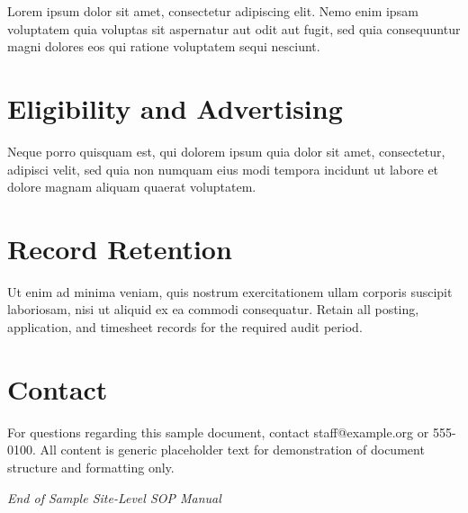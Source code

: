 \documentclass[11pt,a4paper,oneside]{article}
\begin{document}
Lorem ipsum dolor sit amet, consectetur adipiscing elit. Nemo enim ipsam voluptatem quia voluptas sit aspernatur aut odit aut fugit, sed quia consequuntur magni dolores eos qui ratione voluptatem sequi nesciunt.

\section{Eligibility and Advertising}
Neque porro quisquam est, qui dolorem ipsum quia dolor sit amet, consectetur, adipisci velit, sed quia non numquam eius modi tempora incidunt ut labore et dolore magnam aliquam quaerat voluptatem.

\section{Record Retention}
Ut enim ad minima veniam, quis nostrum exercitationem ullam corporis suscipit laboriosam, nisi ut aliquid ex ea commodi consequatur. Retain all posting, application, and timesheet records for the required audit period.

\section{Contact}
For questions regarding this sample document, contact staff@example.org or 555-0100. All content is generic placeholder text for demonstration of document structure and formatting only.

\vspace{1cm}
\noindent\hrulefill
\noindent\textit{End of Sample Site-Level SOP Manual}
\end{document}
